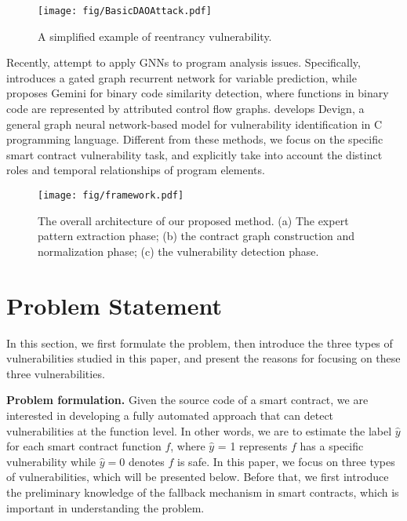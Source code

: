 \begin{figure}
    \begin{center}
     \texttt{[image: fig/BasicDAOAttack.pdf]}
    \end{center}
     \vspace{-1.0em}
 \caption{A simplified example of reentrancy vulnerability.}
  \label{fig_dao}
  \vspace{-1.5em}
\end{figure}

Recently, \cite{Miltiadis,xu2017neural,devign,shen2019neuro} attempt to apply GNNs to program analysis issues. Specifically, \cite{Miltiadis} introduces a gated graph recurrent network for variable prediction, while \cite{xu2017neural} proposes Gemini for binary code similarity detection, where functions in binary code are represented by attributed control flow graphs. \cite{devign} develops Devign, a general graph neural network-based model for vulnerability identification in C programming language. Different from these methods, we focus on the specific smart contract vulnerability task, and explicitly take into account the distinct roles and temporal relationships of program elements.

\begin{figure*}
    \begin{center}
     \texttt{[image: fig/framework.pdf]}
\vspace{-1.0em}
    \end{center}
 \caption{The overall architecture of our proposed method. (a) The expert pattern extraction phase; (b) the contract graph construction and normalization phase; (c) the vulnerability detection phase.} 
 \label{fig_framework}
 \vspace{-1.6em}
\end{figure*}

\section{Problem Statement}
\label{sec_problem}
In this section, we first formulate the problem, then introduce the three types of vulnerabilities studied in this paper, and present the reasons for focusing on these three vulnerabilities.

\label{preliminaries} 
\textbf{Problem formulation.} Given the source code of a smart contract, we are interested in developing a fully automated approach that can detect vulnerabilities at the function level. In other words, we are to estimate the label $\hat{y}$ for each smart contract function $f$, where $\hat{y}$ = 1 represents $f$ has a specific vulnerability while $\hat{y} = 0$ denotes $f$ is safe. In this paper, we focus on three types of vulnerabilities, which will be presented below. Before that, we first introduce the preliminary knowledge of the fallback mechanism in smart contracts, which is important in understanding the problem.

